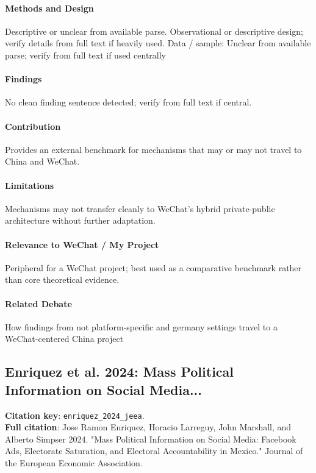 \documentclass[12pt]{article}
\begin{document}
\paragraph{Methods and Design} Descriptive or unclear from available parse. Observational or descriptive design; verify details from full text if heavily used. Data / sample: Unclear from available parse; verify from full text if used centrally

\paragraph{Findings} No clean finding sentence detected; verify from full text if central.

\paragraph{Contribution} Provides an external benchmark for mechanisms that may or may not travel to China and WeChat.

\paragraph{Limitations} Mechanisms may not transfer cleanly to WeChat's hybrid private-public architecture without further adaptation.

\paragraph{Relevance to WeChat / My Project} Peripheral for a WeChat project; best used as a comparative benchmark rather than core theoretical evidence.

\paragraph{Related Debate} How findings from not platform-specific and germany settings travel to a WeChat-centered China project


\subsection{Enriquez et al. 2024: Mass Political Information on Social Media...}
\textbf{Citation key}: \texttt{enriquez\_2024\_jeea}.\\
\textbf{Full citation}: Jose Ramon Enriquez, Horacio Larreguy, John Marshall, and Alberto Simpser 2024. "Mass Political Information on Social Media: Facebook Ads, Electorate Saturation, and Electoral Accountability in Mexico." Journal of the European Economic Association.
\end{document}
